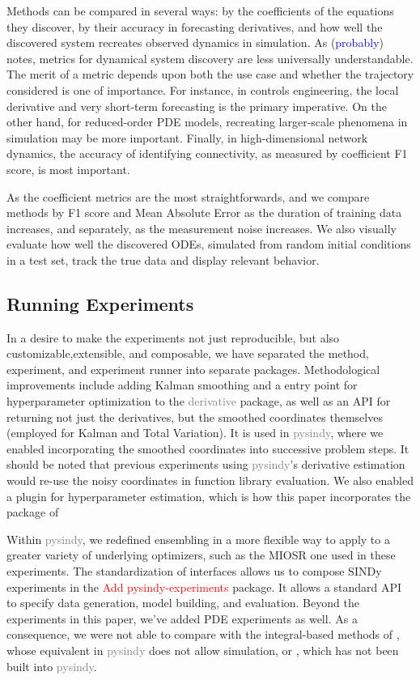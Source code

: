 \documentclass{article}
\newcommand{\red}[1]{\textcolor{red}{#1}}
\newcommand{\blue}[1]{\textcolor{blue}{#1}}
\newcommand{\gray}[1]{\textcolor{gray}{#1}}
\begin{document}
Methods can be compared in several ways: by the coefficients of the equations they discover, by their accuracy in forecasting derivatives, and how well the discovered system recreates observed dynamics in simulation.  As \cite{Gilpin2023} (\blue{probably}) notes,  metrics for dynamical system discovery are less universally understandable.  The merit of a metric depends upon both the use case and whether the trajectory considered is one of importance.  For instance, in controls engineering, the local derivative and very short-term forecasting is the primary imperative.  On the other hand, for reduced-order PDE models, recreating larger-scale phenomena in simulation may be more important.  Finally, in high-dimensional network dynamics, the accuracy of identifying connectivity, as measured by coefficient F1 score, is most important.

As the coefficient metrics are the most straightforwards, and we compare methods by F1 score and Mean Absolute Error as the duration of training data increases, and separately, as the measurement noise increases.  We also visually evaluate how well the discovered ODEs, simulated from random initial conditions in a test set, track the true data and display relevant behavior.

\subsection{Running Experiments}

In a desire to make the experiments not just reproducible, but also customizable,extensible, and composable, we have separated the method, experiment, and experiment runner into separate packages.  Methodological improvements include adding Kalman smoothing and a entry point for hyperparameter optimization to the \gray{derivative} package, as well as an API for returning not just the derivatives, but the smoothed coordinates themselves (employed for Kalman and Total Variation).  It is used in \gray{pysindy}, where we enabled incorporating the smoothed coordinates into successive problem steps.  It should be noted that previous experiments using \gray{pysindy}'s derivative estimation would re-use the noisy coordinates in function library evaluation.  We also enabled a plugin for hyperparameter estimation, which is how this paper incorporates the package of \cite{Barratt2020}

Within \gray{pysindy}, we redefined ensembling in a more flexible way to apply to a greater variety of underlying optimizers, such as the MIOSR one used in these experiments.  The standardization of interfaces allows us to compose SINDy experiments in the \red{Add pysindy-experiments} package.  It allows a standard API to specify data generation, model building, and evaluation.  Beyond the experiments in this paper, we've added PDE experiments as well.  As a consequence, we were not able to compare with the integral-based methods of \cite{messenger2021bweak}, whose equivalent in \gray{pysindy} does not allow simulation, or \cite{Hirsh2022}, which has not been built into \gray{pysindy}.
\end{document}
